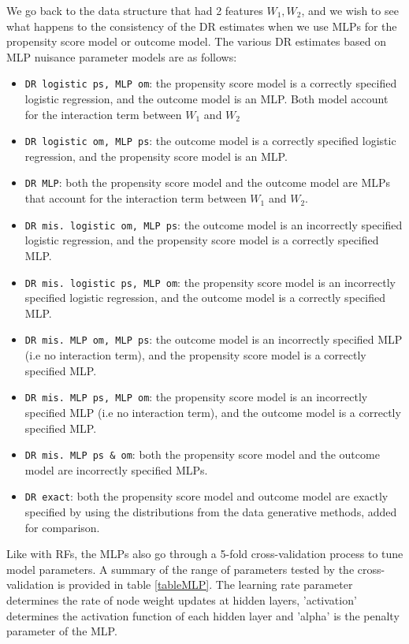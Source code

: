 \documentclass[12pt,twoside]{article}
\begin{document}
We go back to the data structure that had 2 features $W_1, W_2$, and we wish to see what happens to the consistency of the DR estimates when we use MLPs for the propensity score model or outcome model. The various DR estimates based on MLP nuisance parameter models are as follows: 
\begin{itemize}
    \item \texttt{DR logistic ps, MLP om}: the propensity score model is a correctly specified logistic regression, and the outcome model is an MLP. Both model account for the interaction term between $W_1$ and $W_2$
    \item \texttt{DR logistic om, MLP ps}: the outcome model is a correctly specified logistic regression, and the propensity score model is an MLP.
    \item \texttt{DR MLP}: both the propensity score model and the outcome model are MLPs that account for the interaction term between $W_1$ and $W_2$.
    \item \texttt{DR mis. logistic om, MLP ps}: the outcome model is an incorrectly specified logistic regression, and the propensity score model is a correctly specified MLP.
    \item \texttt{DR mis. logistic ps, MLP om}: the propensity score model is an incorrectly specified logistic regression, and the outcome model is a correctly specified MLP.
    \item \texttt{DR mis. MLP om, MLP ps}: the outcome model is an incorrectly specified MLP (i.e no interaction term), and the propensity score model is a correctly specified MLP.
    \item \texttt{DR mis. MLP ps, MLP om}: the propensity score model is an incorrectly specified MLP (i.e no interaction term), and the outcome model is a correctly specified MLP.
    \item \texttt{DR mis. MLP ps \& om}: both the propensity score model and the outcome model are incorrectly specified MLPs.
    \item \texttt{DR exact}: both the propensity score model and outcome model are exactly specified by using the distributions from the data generative methods, added for comparison.
\end{itemize}

Like with RFs, the MLPs also go through a 5-fold cross-validation process to tune model parameters. A summary of the range of parameters tested by the cross-validation is provided in table \ref{tableMLP}. The learning rate parameter determines the rate of node weight updates at hidden layers, 'activation' determines the activation function of each hidden layer and 'alpha' is the penalty parameter of the MLP.
\end{document}
